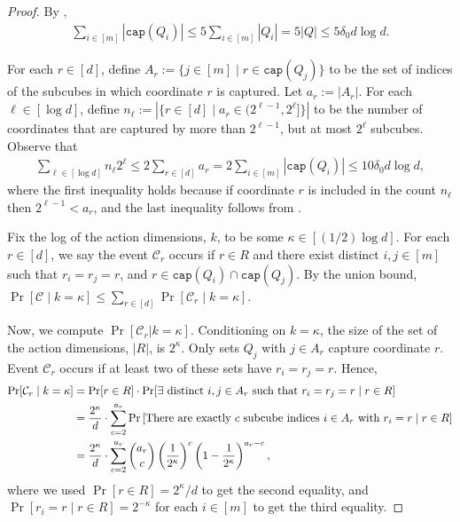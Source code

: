 \documentclass{toc}
\newcommand{\cC}{\ensuremath{\mathcal{C}}}
\newcommand{\lbconst}{\ensuremath{\delta_0}}
\newcommand{\capt}{\mathtt{cap}}
\newcommand{\Lem}[1]{\expref{Lemma}{lem:#1}}
\begin{document}
\begin{proof}
By \Lem{comb},
\begin{align}
\sum_{i \in [m]} |\capt(Q_i)| \leq 5 \sum_{i \in [m]} |Q_i|  = 5|Q| \leq 5 \lbconst d\log d. \label{eqn:comb}
\end{align}

For each $r \in [d]$, define $A_r := \{j \in [m]\mid r\in \capt(Q_j)\}$ to be the set of indices of the subcubes in which coordinate $r$ is captured. Let $a_r := |A_r|$.
For each $\ell \in [\log d]$, define $n_\ell := |\{r \in [d]\mid a_r \in (2^{\ell-1},2^{\ell}]\}|$ to be the number of coordinates that are captured by more than $2^{\ell-1}$, but at most $2^\ell$ subcubes.
Observe that
\begin{align}
\sum_{\ell \in [\log d]} n_\ell 2^\ell \leq 2\sum_{r\in [d]} a_r = 2 \sum_{i \in [m]} |\capt(Q_i)| \leq 10 \lbconst d \log d, \label{eqn:006}
\end{align}
where the first inequality holds because if coordinate $r$ is included in the count $n_\ell$ then $2^{\ell-1}<a_r$, and the last inequality follows from .

Fix the log of the action dimensions, $k$, to be some $\kappa \in [({1}/{2})\log d ]$. For each $r\in [d]$, we say the event $\cC_r$ occurs if
 $r \in R$ and there exist distinct $i,j\in [m]$ such that $r_i = r_j = r$, and $r \in \capt(Q_i)\cap\capt(Q_j)$. By the union
bound, $\Pr[\cC \mid k = \kappa] \leq \sum_{r \in [d]} \Pr[\cC_r \mid k = \kappa]$.

Now, we compute $\Pr[\cC_r|k = \kappa]$.
Conditioning on $k = \kappa$, the size of the set of 
the %
action dimensions, $|R|$, is $2^{\kappa}$.
Only sets $Q_j$ with $j \in A_r$ capture coordinate $r$.
Event $\cC_r$ occurs if at least two of these sets have $r_i = r_j = r$. Hence,
\begin{align}
\Pr[\cC_r \mid k = \kappa] & = \Pr[r\in R]\cdot \Pr[\exists \text{ distinct } i,j\in A_r \text{ such that } r_i = r_j = r \mid r \in R] \label{eq:C_r-prob} \\
%
&= \frac{2^{\kappa}}{d} \cdot \sum\limits_{c = 2}^{a_r} \Pr\left[\text{There are exactly $c$ subcube indices } i\in A_r \text{ with } r_i=r \mid r \in R \right] \notag \\
& = \frac{2^{\kappa}}{d}\cdot \sum\limits_{c = 2}^{a_r} \binom{a_r}{c} \left(\frac{1}{2^{\kappa}} \right)^c \left(1-\frac{1}{2^{\kappa}} \right)^{a_r-c}, \label{eq:007}
\end{align}
where we used $\Pr[r \in R] = 2^\kappa/d$ to get the second equality, and $\Pr[r_i = r \mid r \in R] = 2^{-\kappa}$ for each $i \in [m]$ to get the third equality.
%
%


\end{proof}
\end{document}

